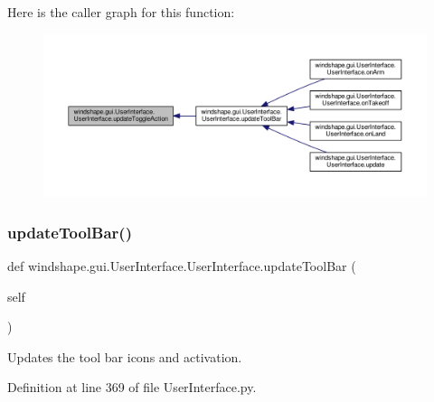 Here is the caller graph for this function\+:\nopagebreak
\begin{figure}[H]
\begin{center}
\leavevmode
\includegraphics[width=350pt]{classwindshape_1_1gui_1_1_user_interface_1_1_user_interface_ad5d42b4891098687b296ef6893d7274d_icgraph}
\end{center}
\end{figure}
\mbox{\label{classwindshape_1_1gui_1_1_user_interface_1_1_user_interface_a0c543aa08f2f27a8c65a3c6de8963f85}} 
\subsubsection{\texorpdfstring{update\+Tool\+Bar()}{updateToolBar()}}
{\footnotesize\ttfamily def windshape.\+gui.\+User\+Interface.\+User\+Interface.\+update\+Tool\+Bar (\begin{DoxyParamCaption}\item[{}]{self }\end{DoxyParamCaption})}

\begin{DoxyVerb}Updates the tool bar icons and activation.\end{DoxyVerb}
 

Definition at line 369 of file User\+Interface.\+py.

